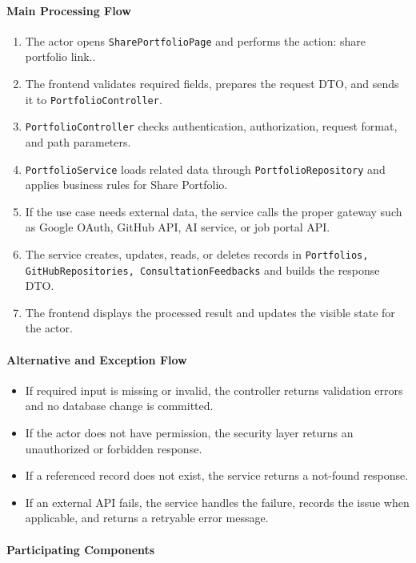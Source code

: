\paragraph{Main Processing Flow}

\begin{enumerate}
    \item The actor opens \texttt{SharePortfolioPage} and performs the action: share portfolio link..
    \item The frontend validates required fields, prepares the request DTO, and sends it to \texttt{PortfolioController}.
    \item \texttt{PortfolioController} checks authentication, authorization, request format, and path parameters.
    \item \texttt{PortfolioService} loads related data through \texttt{PortfolioRepository} and applies business rules for Share Portfolio.
    \item If the use case needs external data, the service calls the proper gateway such as Google OAuth, GitHub API, AI service, or job portal API.
    \item The service creates, updates, reads, or deletes records in \texttt{Portfolios, GitHubRepositories, ConsultationFeedbacks} and builds the response DTO.
    \item The frontend displays the processed result and updates the visible state for the actor.
\end{enumerate}

\paragraph{Alternative and Exception Flow}

\begin{itemize}
    \item If required input is missing or invalid, the controller returns validation errors and no database change is committed.
    \item If the actor does not have permission, the security layer returns an unauthorized or forbidden response.
    \item If a referenced record does not exist, the service returns a not-found response.
    \item If an external API fails, the service handles the failure, records the issue when applicable, and returns a retryable error message.
\end{itemize}

\paragraph{Participating Components}

